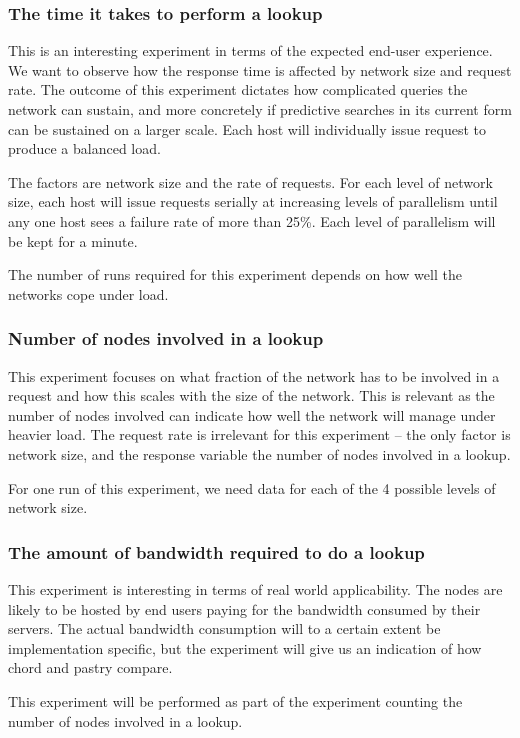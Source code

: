 \subsubsection{The time it takes to perform a lookup}
This is an interesting experiment in terms of the expected end-user experience. We want to observe how the response time is affected by network size and request rate. The outcome of this experiment dictates how complicated queries the network can sustain, and more concretely if predictive searches in its current form can be sustained on a larger scale. Each host will individually issue request to produce a balanced load.

The factors are network size and the rate of requests. 
For each level of network size, each host will issue requests serially at increasing levels of parallelism until any one host sees a failure rate of more than 25\%. Each level of parallelism will be kept for a minute.

The number of runs required for this experiment depends on how well the networks cope under load.

\subsubsection{Number of nodes involved in a lookup}
This experiment focuses on what fraction of the network has to be involved in a request and how this scales with the size of the network. This is relevant as the number of nodes involved can indicate how well the network will manage under heavier load.
The request rate is irrelevant for this experiment -- the only factor is network size, and the response variable the number of nodes involved in a lookup.

For one run of this experiment, we need data for each of the 4 possible levels of network size.

\subsubsection{The amount of bandwidth required to do a lookup}
This experiment is interesting in terms of real world applicability. The nodes are likely to be hosted by end users paying for the bandwidth consumed by their servers. The actual bandwidth consumption will to a certain extent be implementation specific, but the experiment will give us an indication of how chord and pastry compare.

This experiment will be performed as part of the experiment counting the number of nodes involved in a lookup.

